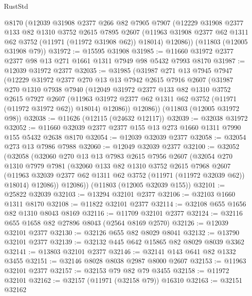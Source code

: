 \begin{lexlean}{RustStd}
\begin{coremodule}
    @8170
    (@12039
      @31908
      @2377
      @266
      @82
      @7905
      @7907
      (@12229
        @31908
        @2377
        @133
        @82
        @1310
        @3752
        @2615
        @7895
        @2607
        (@11963 @31908 @2377 @62 @1311 @62 @3752 (@11971 (@11972 @31908 @62)) @18014)
        @12086))
    (@11803 (@12005 @31908 @79))
@31972 := @15595 @31908
@31985 := @11660 @31972 @2377 @2377 @98 @13 @271 @1661 @1311 @7949 @98 @5432 @7993 @8170
@31987 := @12039 @31972 @2377
@32035 := @31985
    (@31987
      @271
      @13
      @7945
      @7947
      (@12229
        @31972
        @2377
        @270
        @13
        @13
        @7942
        @2615
        @7916
        @2607
        (@31987
          @270
          @1310
          @7938
          @7940
          (@12049
            @31972
            @2377
            @133
            @82
            @1310
            @3752
            @2615
            @7927
            @2607
            (@11963 @31972 @2377 @62 @1311 @62 @3752 (@11971 (@11972 @31972 @62)) @18014)
            @12086))
        @12086))
    (@11803 (@12005 @31972 @98))
@32038 := @11626 (@12115 (@24632 @12117))
@32039 := @32038 @31972
@32052 := @11660 @32039 @2377 @2377 @155 @13 @273 @1660 @1311 @7990 @155 @5432 @2638 @8170
@32054 := @12039 @32039 @2377
@32058 := @32054 @273 @13 @7986 @7988
@32060 := @12049 @32039 @2377
@32100 := @32052
    (@32058
      (@32060
        @270
        @13
        @13
        @7983
        @2615
        @7956
        @2607
        (@32054
          @270
          @1310
          @7979
          @7981
          (@32060
            @133
            @82
            @1310
            @3752
            @2615
            @7968
            @2607
            (@11963 @32039 @2377 @62 @1311 @62 @3752 (@11971 (@11972 @32039 @62)) @18014)
            @12086))
        @12086))
    (@11803 (@12005 @32039 @155))
@32101 := @25822 @32039
@32103 := @13294 @32101 @2377
@32106 := @32103 @1660 @1311 @8170
@32108 := @11822 @32101 @2377
@32114 := @32108 @655 @1656 @82 @1310 @8043 @8169
@32116 := @11709 @32101 @2377
@32124 := @32116 @655 @1658 @82 @27896 @8043 (@2564 @8169 @2570)
@32126 := @12039 @32101 @2377
@32130 := @32126 @655 @82 @8029 @8041
@32132 := @13790 @32101 @2377
@32139 := @32132 @445 @642 @15865 @82 @8029 @8039 @3362
@32141 := @13803 @32101 @2377
@32146 := @32141 @143 @641 @82 @1332 @3455
@32151 := @32146 @8028 @8038 @2987 @8000 @2607
@32153 := @11963 @32101 @2377
@32157 := @32153 @79 @82 @79 @3455
@32158 := @11972 @32101
@32162 := @32157 (@11971 (@32158 @79)) @16310
@32163 := @32151 @32162

\end{coremodule}
\end{lexlean}
